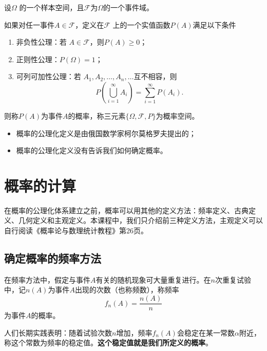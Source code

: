 \begin{definition}[概率] \label{def:probability} 
设$\Omega$ 的一个样本空间，且$\mathcal{F}$为$\Omega $的一个事件域。

如果对任一事件$A \in \mathcal{F}$，定义在$\mathcal{F}$ 上的一个实值函数$P(A)$满足以下条件
\begin{enumerate}
    \item 非负性公理：若 $A \in \mathcal{F}$，则$P(A)\geq 0$；
    \item 正则性公理：$P(\Omega)=1$；
    \item 可列可加性公理：若 $A_{1} ,A_{2} ,\dots ,A_{n} ,\dots $互不相容，则$$P \left(\bigcup_{i=1}^{\infty }A_{i}  \right)=\sum_{i=1}^{\infty } P(A_{i} ).$$
\end{enumerate}
则称$P(A)$为事件$A$的概率，称三元素$\{\Omega,\mathcal{F},P\}$为概率空间。
\end{definition}

\begin{remark}
    \begin{itemize}
        \item 概率的公理化定义是由俄国数学家柯尔莫格罗夫提出的；
        \item 概率的公理化定义没有告诉我们如何确定概率。
    \end{itemize}
\end{remark}
\section{概率的计算}
在概率的公理化体系建立之前，概率可以用其他的定义方法：频率定义、古典定义、几何定义和主观定义。本课程中，我们只介绍前三种定义方法，主观定义可以自行阅读《概率论与数理统计教程》第26页。
\subsection{确定概率的频率方法}
在频率方法中，假定与事件$A$有关的随机现象可大量重复进行。在$n$次重复试验中，记$n(A)$为事件$A$出现的次数（也称频数），称频率
$$
f_n(A) = \frac{n(A)}{n}
$$
为事件$A$的概率。

人们长期实践表明：随着试验次数$n$增加，频率$f_n(A)$会稳定在某一常数$\alpha$附近，称这个常数为频率的稳定值。{\textbf{这个稳定值就是我们所定义的概率}}。


